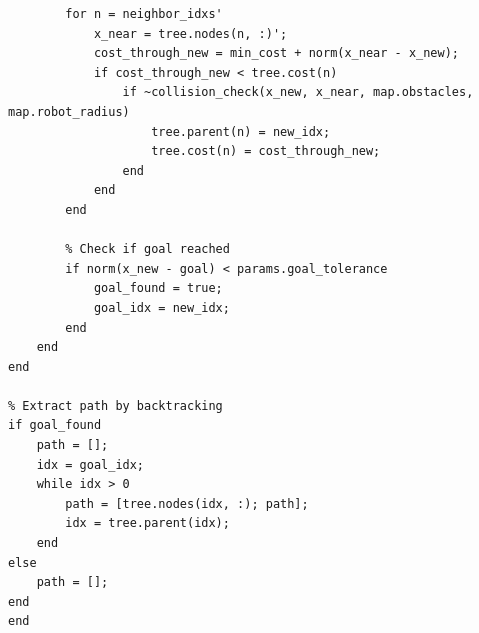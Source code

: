 \documentclass[12pt,a4paper]{scrartcl}
\begin{document}
\begin{lstlisting}[style=matlabstyle,caption={RRT* Main Function (rrt\_star.m) - Excerpt}]
        % Rewire neighbors
        for n = neighbor_idxs'
            x_near = tree.nodes(n, :)';
            cost_through_new = min_cost + norm(x_near - x_new);
            if cost_through_new < tree.cost(n)
                if ~collision_check(x_new, x_near, map.obstacles, map.robot_radius)
                    tree.parent(n) = new_idx;
                    tree.cost(n) = cost_through_new;
                end
            end
        end
        
        % Check if goal reached
        if norm(x_new - goal) < params.goal_tolerance
            goal_found = true;
            goal_idx = new_idx;
        end
    end
end

% Extract path by backtracking
if goal_found
    path = [];
    idx = goal_idx;
    while idx > 0
        path = [tree.nodes(idx, :); path];
        idx = tree.parent(idx);
    end
else
    path = [];
end
end
	\end{lstlisting}
	
\end{document}
